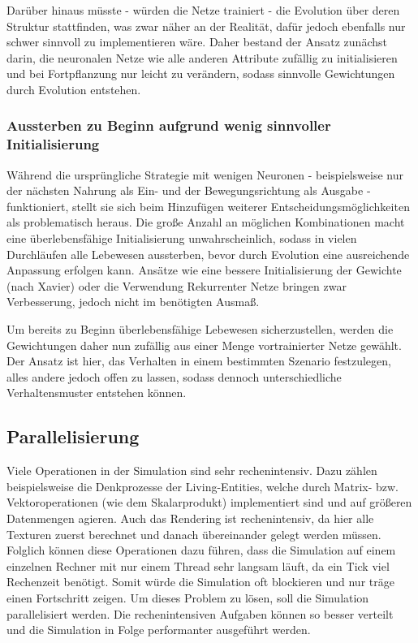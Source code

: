 \documentclass[course=erap]{aspdoc}
\begin{document}
Darüber hinaus müsste - würden die Netze trainiert - die Evolution über deren Struktur stattfinden, was zwar näher an der Realität, dafür jedoch ebenfalls nur schwer sinnvoll zu implementieren wäre.
Daher bestand der Ansatz zunächst darin, die neuronalen Netze wie alle anderen Attribute zufällig zu initialisieren und bei Fortpflanzung nur leicht zu verändern, sodass sinnvolle Gewichtungen durch Evolution entstehen.


\subsubsection{Aussterben zu Beginn aufgrund wenig sinnvoller Initialisierung}
\label{sssec:nn-problem}
Während die ursprüngliche Strategie mit wenigen Neuronen - beispielsweise nur der nächsten Nahrung als Ein- und der Bewegungsrichtung als Ausgabe - funktioniert, stellt sie sich beim Hinzufügen weiterer Entscheidungsmöglichkeiten als problematisch heraus. Die große Anzahl an möglichen Kombinationen macht eine überlebensfähige Initialisierung unwahrscheinlich, sodass in vielen Durchläufen alle Lebewesen aussterben, bevor durch Evolution eine ausreichende Anpassung erfolgen kann. Ansätze wie eine bessere Initialisierung der Gewichte (nach Xavier) oder die Verwendung Rekurrenter Netze bringen zwar Verbesserung, jedoch nicht im benötigten Ausmaß.

Um bereits zu Beginn überlebensfähige Lebewesen sicherzustellen, werden die Gewichtungen daher nun zufällig aus einer Menge vortrainierter Netze gewählt. Der Ansatz ist hier, das Verhalten in einem bestimmten Szenario festzulegen, alles andere jedoch offen zu lassen, sodass dennoch unterschiedliche Verhaltensmuster entstehen können.


\subsection{Parallelisierung}
Viele Operationen in der Simulation sind sehr rechenintensiv. Dazu zählen beispielsweise die Denkprozesse der Living-Entities, welche durch Matrix- bzw. Vektoroperationen (wie dem Skalarprodukt) implementiert sind und auf größeren Datenmengen agieren. Auch das Rendering ist rechenintensiv, da hier alle Texturen zuerst berechnet und danach übereinander gelegt werden müssen. Folglich können diese Operationen dazu führen, dass die Simulation auf einem einzelnen Rechner mit nur einem Thread sehr langsam läuft, da ein Tick viel Rechenzeit benötigt. Somit würde die Simulation oft blockieren und nur träge einen Fortschritt zeigen. Um dieses Problem zu lösen, soll die Simulation parallelisiert werden. Die rechenintensiven Aufgaben können so besser verteilt und die Simulation in Folge performanter ausgeführt werden.
\end{document}
